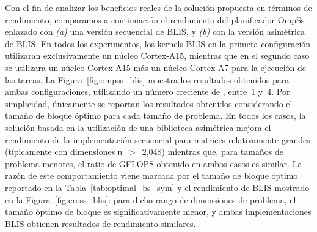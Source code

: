 Con el fin de analizar los beneficios reales de la solución propuesta en términos de rendimiento, comparamos a continuación
el rendimiento del planificador OmpSs enlazado con {\em (a)} una versión secuencial de BLIS, y {\em (b)} con la versión asimétrica de BLIS. 
En todos los experimentos, los kernels BLIS en la primera configuración utilizaran exclusivamente un núcleo Cortex-A15, mientras
que en el segundo caso se utilizara un núcleo Cortex-A15 más un núcleo Cortex-A7 para la ejecución de las tareas.
%
La Figura~\ref{fig:ompss_blis} muestra los resultados obtenidos para ambas configuraciones, utilizando un número creciente
de \wts, entre~1 y~4. Por simplicidad, únicamente se reportan los resultados obtenidos considerando el tamaño de bloque óptimo
para cada tamaño de problema. En todos los casos, la solución basada en la utilización de una biblioteca asimétrica mejora
el rendimiento de la implementación secuencial para matrices relativamente grandes (típicamente con dimensiones {\tt n}~$>$~2,048)
mientras que, para tamaños de problema menores, el ratio de GFLOPS obtenido en ambos casos es similar. 
La razón de este comportamiento viene marcada por el tamaño de bloque óptimo reportado en la Tabla~\ref{tab:optimal_bs_sym}
y el rendimiento de BLIS mostrado en la Figura~\ref{fig:cross_blis}: para dicho rango de dimensiones de problema,
el tamaño óptimo de bloque es significativamente menor, y ambas implementaciones BLIS obtienen resultados de rendimiento similares.


